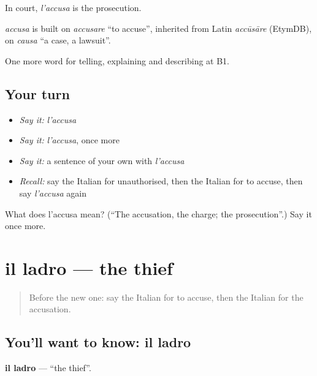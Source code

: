 In court, \emph{l'accusa} is the prosecution.

\begin{cousinweb}
\emph{accusa} is built on \emph{accusare} \textquotedblleft{}to accuse\textquotedblright{}, inherited from Latin \emph{accūsāre} (EtymDB), on \emph{causa} \textquotedblleft{}a case, a lawsuit\textquotedblright{}.
\end{cousinweb}

\begin{grammarlens}[title={What you've built}]
One more word for telling, explaining and describing at B1.
\end{grammarlens}

\subsection*{Your turn}
\begin{itemize}
\raggedright
  \item \emph{Say it:} \emph{l'accusa}
  \item \emph{Say it:} \emph{l'accusa}, once more
  \item \emph{Say it:} a sentence of your own with \emph{l'accusa}
  \item \emph{Recall:} say the Italian for unauthorised, then the Italian for to accuse, then say \emph{l'accusa} again
\end{itemize}

\begin{tcolorbox}[breakable,colback=teal!4,colframe=teal!35!black,title={Before you move on}]
What does l'accusa mean? (\textquotedblleft{}The accusation, the charge; the prosecution\textquotedblright{}.) Say it once more.
\end{tcolorbox}
\section[il ladro]{il ladro — the thief}

\label{lesson:IT-C391-ladro}



\begin{quote}
Before the new one: say the Italian for to accuse, then the Italian for the accusation.
\end{quote}

\subsection*{You'll want to know: il ladro}
\textbf{il ladro} — \textquotedblleft{}the thief\textquotedblright{}.

